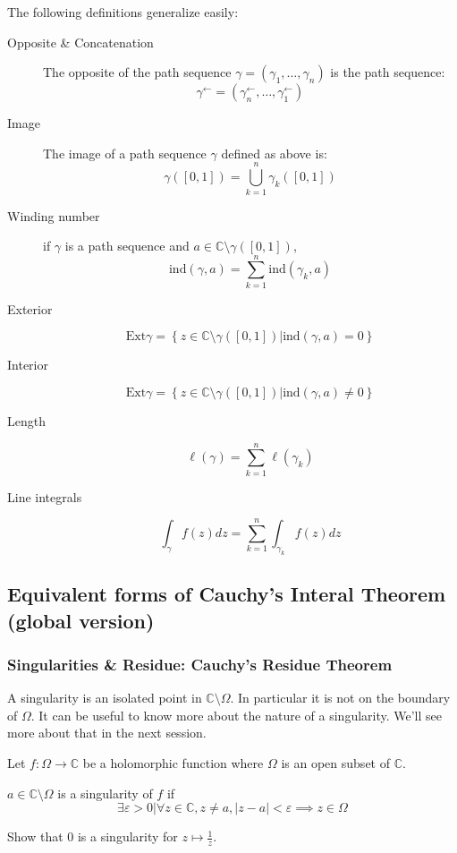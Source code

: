 \begin{defi}
    The following definitions generalize easily:

    \begin{description}
        \item[Opposite \& Concatenation] The opposite of the path sequence $\gamma = (\gamma_1, \dots, \gamma_n)$ is the path sequence:
            $$\gamma^\leftarrow  = (\gamma_n^\leftarrow, \dots, \gamma_1^\leftarrow)$$
        \item[Image] The image of a path sequence $\gamma$ defined as above is:
            $$ \gamma([0,1]) = \bigcup_{k=1}^n{\gamma_k([0,1])} $$
        \item[Winding number] if $\gamma$ is a path sequence and $a\in\mathbb{C}\setminus\gamma([0,1])$,
            $$\mathrm{ind}(\gamma, a) = \sum_{k=1}^n\mathrm{ind}(\gamma_k, a)$$

        \item[Exterior] 
            $$\mathrm{Ext}\gamma = \left\lbrace z\in\mathbb{C}\setminus\gamma([0,1]) \vert \mathrm{ind}(\gamma, a) = 0 \right\rbrace$$
        \item[Interior] 
            $$\mathrm{Ext}\gamma = \left\lbrace z\in\mathbb{C}\setminus\gamma([0,1]) \vert \mathrm{ind}(\gamma, a) \neq 0 \right\rbrace$$
        \item[Length] 
            $$\ell(\gamma) = \sum_{k=1}^n \ell(\gamma_k)$$
        \item[Line integrals]
            $$\int_\gamma f(z)dz = \sum_{k=1}^n \int_{\gamma_k}f(z)dz$$
    \end{description}
\end{defi}

\subsection{Equivalent forms of Cauchy's Interal Theorem (global version)}


\subsubsection{Singularities \& Residue: Cauchy's Residue Theorem}

A singularity is an isolated point in $\mathbb{C}\setminus\Omega$. In particular it is not on the boundary of $\Omega$. It can be useful to know more about the nature of a singularity. We'll see more about that in the next session.

\begin{defi}[Singularity]
    Let $f: \Omega \rightarrow \mathbb{C}$ be a holomorphic function where $\Omega$ is an open subset of $\mathbb{C}$.
    
    $a\in\mathbb{C}\setminus\Omega$ is a singularity of $f$ if
    $$ \exists \varepsilon > 0 \vert \forall z\in\mathbb{C}, z \neq a, |z-a| < \varepsilon \implies z\in\Omega$$
    
\end{defi}
\begin{example}[$\star$]
    Show that $0$ is a singularity for $z \mapsto \frac{1}{z}$.
\end{example}


